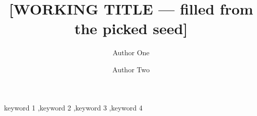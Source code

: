 \documentclass[preprint,12pt]{elsarticle}
\begin{document}
\begin{frontmatter}
\title{[WORKING TITLE — filled from the picked seed]}

\author[addr1]{Author One}
\author[addr2]{Author Two}

\address[addr1]{Department, Institution 1, City, Country.}
\address[addr2]{Department, Institution 2, City, Country.}



\begin{keyword}
keyword 1 \sep keyword 2 \sep keyword 3 \sep keyword 4
\end{keyword}
\end{frontmatter}






\appendix



\end{document}
